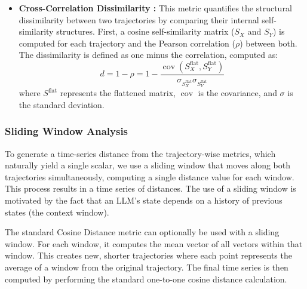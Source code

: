 \documentclass[a4paper,12pt]{article}
\begin{document}
\begin{itemize}
    \item \textbf{Cross-Correlation Dissimilarity \cite{pearson} \cite{scipy_pearson}:} This metric quantifies the structural dissimilarity between two trajectories by comparing their internal self-similarity structures. First, a cosine self-similarity matrix ($S_X$ and $S_Y$) is computed for each trajectory and the Pearson correlation ($\rho$) between both. The dissimilarity is defined as one minus the correlation, computed as:
    \begin{equation}
        d = 1 - \rho = 1 - \frac{\operatorname{cov}(S_X^\text{flat}, S_Y^\text{flat})}{\sigma_{S_X^\text{flat}} \sigma_{S_Y^\text{flat}}}
    \end{equation}
    where $S^\text{flat}$ represents the flattened matrix, $\operatorname{cov}$ is the covariance, and $\sigma$ is the standard deviation.

\end{itemize}

\subsubsection{Sliding Window Analysis}
\label{sssec:methods_sliding_window}
To generate a time-series distance from the trajectory-wise metrics, which naturally yield a single scalar, we use a sliding window that moves along both trajectories simultaneously, computing a single distance value for each window. This process results in a time series of distances. The use of a sliding window is motivated by the fact that an LLM's state depends on a history of previous states (the context window).

The standard Cosine Distance metric can optionally be used with a sliding window. For each window, it computes the mean vector of all vectors within that window. This creates new, shorter trajectories where each point represents the average of a window from the original trajectory. The final time series is then computed by performing the standard one-to-one cosine distance calculation.



\end{document}
